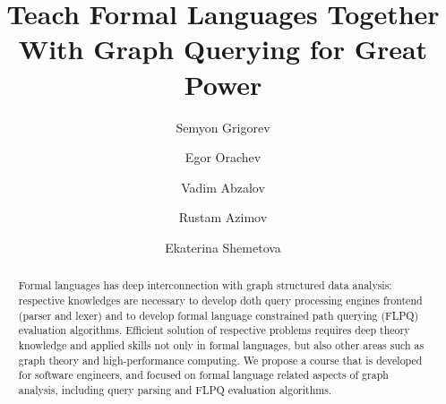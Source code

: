 \documentclass[sigconf]{acmart}
\begin{document}
\title{Teach Formal Languages Together With Graph Querying for Great Power}

\author{Semyon Grigorev}

\author{Egor Orachev}

\author{Vadim Abzalov}

\author{Rustam Azimov}

\author{Ekaterina Shemetova}

\renewcommand{\shortauthors}{Trovato and Tobin, et al.}

\begin{abstract}
  Formal languages has deep interconnection with graph structured data analysis: respective knowledges are necessary to develop doth query processing engines frontend (parser and lexer) and to develop formal language constrained path querying (FLPQ) evaluation algorithms.
  Efficient solution of respective problems requires deep theory knowledge and applied skills not only in formal languages, but also other areas such as graph theory and high-performance computing.
  We propose a course that is developed for software engineers, and focused on formal language related aspects of graph analysis, including query parsing and FLPQ evaluation algorithms.
\end{abstract}
\end{document}
